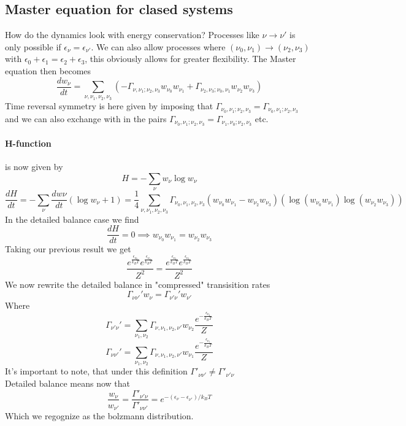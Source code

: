 \documentclass{report}
\begin{document}
\subsection{Master equation for clased systems}
How do the dynamics look with energy conservation? Processes like $\nu \to \nu'$ is only possible if $\epsilon_\nu = \epsilon_{\nu'}$. We can also allow processes where $\left( \nu_0, \nu_1 \right) \to  \left( \nu_2, \nu_3 \right) $ with $\epsilon_0 + \epsilon_1 = \epsilon_2 + \epsilon_3$, this obviously allows for greater flexibility. The Master equation then becomes \[
  \frac{dw_\nu}{dt} = \sum_{\nu, \nu_1, \nu_2, \nu_3} \left( -\Gamma_{\nu,\nu_1; \nu_2, \nu_3} w_{\nu_0} w_{\nu_1} + \Gamma_{\nu_2, \nu_3;\nu_0,\nu_1} w_{\nu_2} w_{\nu_3} \right)  
\] 
Time reversal symmetry is here given by imposing that $\Gamma_{\nu_0, \nu_1 ; \nu_2, \nu_3} = \Gamma_{\nu_0, \nu_1 ; \nu_2, \nu_3}$ and we can also exchange with in the pairs $\Gamma_{\nu_0, \nu_1 ; \nu_2, \nu_3} = \Gamma_{\nu_1, \nu_0 ; \nu_2, \nu_3}$  etc.\\
\paragraph{H-function} is now given by  \[
H = - \sum_{\nu} w_\nu \log w_\nu 
\] \[
\frac{dH}{dt} = - \sum_{\nu} \frac{dw\nu}{dt} \left( \log w_\nu + 1 \right) = \frac{1}{4} \sum_{\nu,\nu_1,\nu_2, \nu_3} \Gamma_{\nu_0,\nu_1,\nu_2,\nu_3}\left( w_{\nu_0} w_{\nu_1} - w_{\nu_2}w_{\nu_3} \right) \left( \log\left( w_{\nu_0} w_{\nu_1} \right) \log\left( w_{\nu_2} w_{\nu_3} \right)   \right)   
\] 
In the detailed balance case we find \[
\frac{dH}{dt} = 0 \implies w_{\nu_0}w_{\nu_1} = w_{\nu_2}w_{\nu_3}
\] Taking our previous result we get \[
\frac{e^{\frac{\epsilon_{\nu_0}}{k_B T}} e^{\frac{\epsilon_{\nu_1}}{k_B T}}}{Z^2} =
\frac{e^{\frac{\epsilon_{\nu_2}}{k_B T}} e^{\frac{\epsilon_{\nu_3}}{k_B T}}}{Z^2}
\] 
We now rewrite the detailed balance in "compressed" transisition rates \[
\Gamma_{\nu \nu'}' w_\nu = \Gamma_{\nu' \nu}' w_{\nu'}
\] Where  \[
\Gamma_{\nu' \nu}' = \sum_{\nu_1, \nu_2} \Gamma_{\nu, \nu_1, \nu_2, \nu'} w_{\nu_2} \frac{e^{- \frac{\epsilon_{\nu_2}}{k_B T}}}{Z}
\] 
\[
\Gamma_{\nu \nu'}' = \sum_{\nu_1, \nu_2} \Gamma_{\nu, \nu_1, \nu_2, \nu'} w_{\nu_1} \frac{e^{- \frac{\epsilon_{\nu_1}}{k_B T}}}{Z}
\] 
It's important to note, that under this definition $\Gamma'_{\nu \nu'} \neq \Gamma'_{\nu' \nu}$ \\
Detailed balance means now that \[
  \frac{w_\nu}{w_{\nu'}} = \frac{\Gamma'_{\nu' \nu}}{\Gamma'_{\nu \nu'}} = e^{- \left( \epsilon_\nu - \epsilon_{\nu'} \right) / k_B T }
\] 
Which we regognize as the bolzmann distribution.
\end{document}
